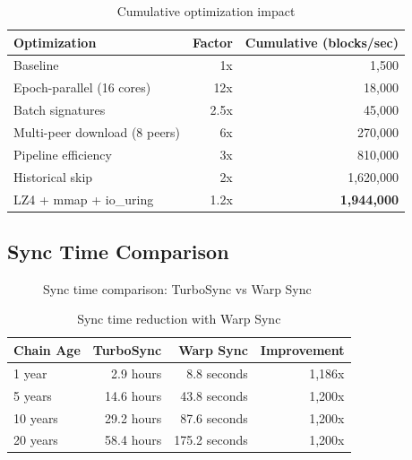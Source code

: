 \documentclass[11pt,a4paper]{article}
\begin{document}
\begin{table}[h]
\centering
\begin{tabular}{lrr}
\toprule
\textbf{Optimization} & \textbf{Factor} & \textbf{Cumulative (blocks/sec)} \\
\midrule
Baseline & 1x & 1,500 \\
Epoch-parallel (16 cores) & 12x & 18,000 \\
Batch signatures & 2.5x & 45,000 \\
Multi-peer download (8 peers) & 6x & 270,000 \\
Pipeline efficiency & 3x & 810,000 \\
Historical skip & 2x & 1,620,000 \\
LZ4 + mmap + io\_uring & 1.2x & \textbf{1,944,000} \\
\bottomrule
\end{tabular}
\caption{Cumulative optimization impact}
\end{table}

\subsection{Sync Time Comparison}

\begin{figure}[h]
\centering
{}
\caption{Sync time comparison: TurboSync vs Warp Sync}
\end{figure}

\begin{table}[h]
\centering
\begin{tabular}{lrrr}
\toprule
\textbf{Chain Age} & \textbf{TurboSync} & \textbf{Warp Sync} & \textbf{Improvement} \\
\midrule
1 year & 2.9 hours & 8.8 seconds & 1,186x \\
5 years & 14.6 hours & 43.8 seconds & 1,200x \\
10 years & 29.2 hours & 87.6 seconds & 1,200x \\
20 years & 58.4 hours & 175.2 seconds & 1,200x \\
\bottomrule
\end{tabular}
\caption{Sync time reduction with Warp Sync}
\end{table}
\end{document}
